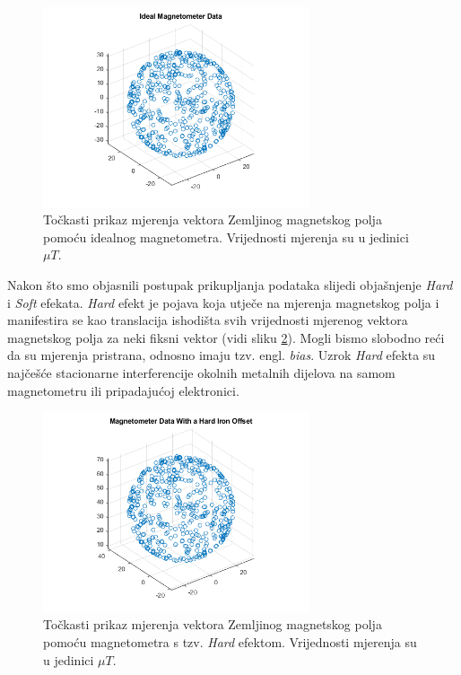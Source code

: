 \documentclass[times, utf8, diplomski, numeric]{templates/template}
\begin{document}
{{{{                \begin{figure}[htb]
                \centering
                \includegraphics[width=0.7\textwidth]{images/mag_ideal.png}
                \caption{Točkasti prikaz mjerenja vektora Zemljinog magnetskog polja pomoću idealnog magnetometra. Vrijednosti mjerenja su u jedinici $\mu T$.}
                \label{fig:mag_ideal}
                \end{figure}

                Nakon što smo objasnili postupak prikupljanja podataka slijedi objašnjenje \emph{Hard} i \emph{Soft} efekata. \emph{Hard} efekt je pojava koja utječe na mjerenja magnetskog polja i manifestira se kao translacija ishodišta svih vrijednosti mjerenog vektora magnetskog polja za neki fiksni vektor (vidi sliku \ref{fig:mag_hard}). Mogli bismo slobodno reći da su mjerenja pristrana, odnosno imaju tzv. engl. \emph{bias}. Uzrok \emph{Hard} efekta su najčešće stacionarne interferencije okolnih metalnih dijelova na samom magnetometru ili pripadajućoj elektronici. 

                \begin{figure}[htb]
                \centering
                \includegraphics[width=0.7\textwidth]{images/mag_hard.png}
                \caption{Točkasti prikaz mjerenja vektora Zemljinog magnetskog polja pomoću magnetometra s tzv. \emph{Hard} efektom. Vrijednosti mjerenja su u jedinici $\mu T$.}
                \label{fig:mag_hard}
                \end{figure}

}}}}
\end{document}
